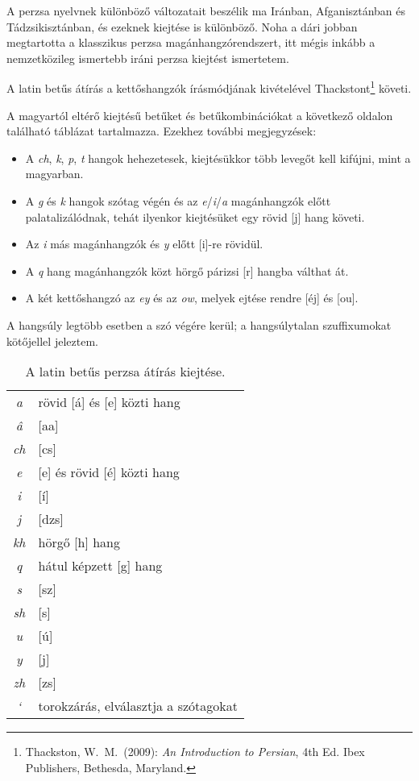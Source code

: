 A perzsa nyelvnek különböző változatait beszélik ma Iránban,
Afganisztánban és Tádzsikisztánban, és ezeknek kiejtése is
különböző. Noha a dári jobban megtartotta a klasszikus perzsa
magánhangzórendszert, itt mégis inkább a nemzetközileg ismertebb iráni
perzsa kiejtést ismertetem.

A latin betűs átírás a kettőshangzók írásmódjának kivételével
Thackstont\footnote{Thackston, W.~M.~(2009): \emph{An Introduction to Persian},
4th Ed. Ibex Publishers, Bethesda, Maryland.} követi.

A magyartól eltérő kiejtésű betűket és betűkombinációkat a következő
oldalon található táblázat tartalmazza. Ezekhez további megjegyzések:

\begin{itemize}
  \item A \emph{ch}, \emph{k}, \emph{p}, \emph{t} hangok hehezetesek,
    kiejtésükkor több levegőt kell kifújni, mint a magyarban.
  \item A \emph{g} és \emph{k} hangok szótag végén és az
    \emph{e}/\emph{i}/\emph{a} magánhangzók előtt palatalizálódnak,
    tehát ilyenkor kiejtésüket egy rövid [j] hang követi.
  \item Az \emph{i} más magánhangzók és \emph{y} előtt [i]-re rövidül.
  \item A \emph{q} hang magánhangzók közt hörgő párizsi [r] hangba
    válthat át.
  \item A két kettőshangzó az \emph{ey} és az \emph{ow}, melyek ejtése
    rendre [éj] és [ou].
\end{itemize}

A hangsúly legtöbb esetben a szó végére kerül; a hangsúlytalan
szuffixumokat kötőjellel jeleztem.

\begin{table}[h]
  \begin{center}
    \smallskip\smallskip
    \begin{tabular}{cl}
      \emph{a} & rövid [á] és [e] közti hang\\
      \emph{â} & [aa]\\
      \emph{ch} & [cs]\\
      \emph{e} & [e] és rövid [é] közti hang\\
      \emph{i} & [í]\\
      \emph{j} & [dzs]\\
      \emph{kh} & hörgő [h] hang\\
      \emph{q} & hátul képzett [g] hang\\
      \emph{s} & [sz]\\
      \emph{sh} & [s]\\
      \emph{u} & [ú]\\
      \emph{y} & [j]\\
      \emph{zh} & [zs]\\
      \emph{`} & torokzárás, elválasztja a szótagokat\\
    \end{tabular}
  \end{center}
  \caption{A latin betűs perzsa átírás kiejtése.}
\end{table}
